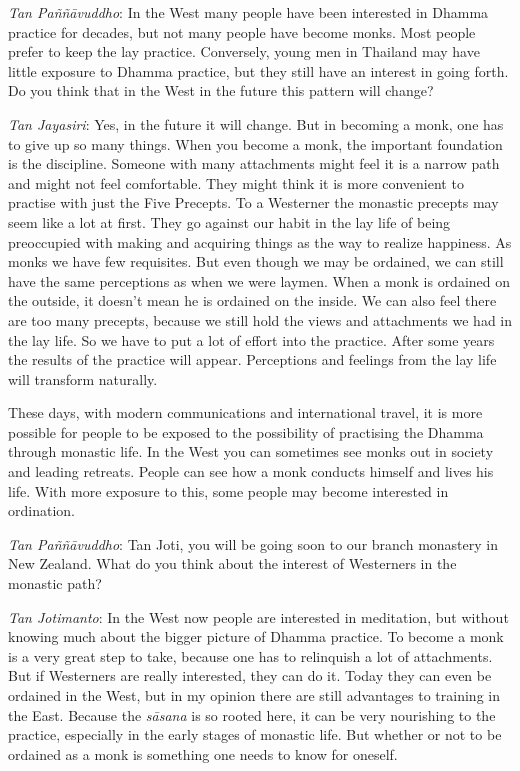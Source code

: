 \emph{Tan Paññāvuddho}‎: In the West many people have been interested in
Dhamma practice for decades, but not many people have become monks. Most
people prefer to keep the lay practice. Conversely, young men in
Thailand may have little exposure to Dhamma practice, but they still
have an interest in going forth. Do you think that in the West in the
future this pattern will change?

\emph{Tan Jayasiri}: Yes, in the future it will change. But in becoming
a monk, one has to give up so many things. When you become a monk, the
important foundation is the discipline. Someone with many attachments
might feel it is a narrow path and might not feel comfortable. They
might think it is more convenient to practise with just the Five
Precepts. To a Westerner the monastic precepts may seem like a lot at
first. They go against our habit in the lay life of being preoccupied
with making and acquiring things as the way to realize happiness. As
monks we have few requisites. But even though we may be ordained, we can
still have the same perceptions as when we were laymen. When a monk is
ordained on the outside, it doesn't mean he is ordained on the inside.
We can also feel there are too many precepts, because we still hold the
views and attachments we had in the lay life. So we have to put a lot of
effort into the practice. After some years the results of the practice
will appear. Perceptions and feelings from the lay life will transform
naturally.

These days, with modern communications and international travel, it is
more possible for people to be exposed to the possibility of practising
the Dhamma through monastic life. In the West you can sometimes see
monks out in society and leading retreats. People can see how a monk
conducts himself and lives his life. With more exposure to this, some
people may become interested in ordination.

\emph{Tan Paññāvuddho}‎: Tan Joti, you will be going soon to our branch
monastery in New Zealand. What do you think about the interest of
Westerners in the monastic path?

\emph{Tan Jotimanto}: In the West now people are interested in
meditation, but without knowing much about the bigger picture of Dhamma
practice. To become a monk is a very great step to take, because one has
to relinquish a lot of attachments. But if Westerners are really
interested, they can do it. Today they can even be ordained in the West,
but in my opinion there are still advantages to training in the East.
Because the \emph{sāsana} is so rooted here, it can be very nourishing
to the practice, especially in the early stages of monastic life. But
whether or not to be ordained as a monk is something one needs to know
for oneself.


